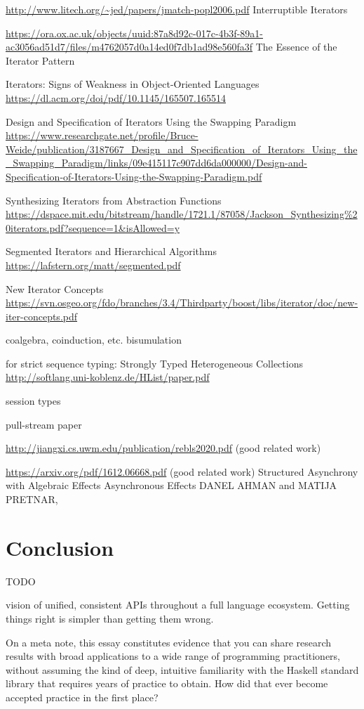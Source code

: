 \documentclass[sigplan,screen,10pt,review]{acmart}
\begin{document}
\url{http://www.litech.org/~jed/papers/jmatch-popl2006.pdf} Interruptible Iterators

\url{https://ora.ox.ac.uk/objects/uuid:87a8d92c-017c-4b3f-89a1-ac3056ad51d7/files/m4762057d0a14ed0f7db1ad98e560fa3f} The Essence of the Iterator Pattern

Iterators: Signs of Weakness in Object-Oriented Languages \url{https://dl.acm.org/doi/pdf/10.1145/165507.165514}

Design and Specification of Iterators Using the Swapping Paradigm \url{https://www.researchgate.net/profile/Bruce-Weide/publication/3187667_Design_and_Specification_of_Iterators_Using_the_Swapping_Paradigm/links/09e415117c907dd6da000000/Design-and-Specification-of-Iterators-Using-the-Swapping-Paradigm.pdf}

Synthesizing Iterators from Abstraction Functions \url{https://dspace.mit.edu/bitstream/handle/1721.1/87058/Jackson_Synthesizing%20iterators.pdf?sequence=1&isAllowed=y}

Segmented Iterators and Hierarchical Algorithms \url{https://lafstern.org/matt/segmented.pdf}

New Iterator Concepts \url{https://svn.osgeo.org/fdo/branches/3.4/Thirdparty/boost/libs/iterator/doc/new-iter-concepts.pdf}

coalgebra, coinduction, etc. bisumulation

for strict sequence typing: Strongly Typed Heterogeneous Collections \url{http://softlang.uni-koblenz.de/HList/paper.pdf}


session types

pull-stream paper

\url{http://jiangxi.cs.uwm.edu/publication/rebls2020.pdf} (good related work)

\url{https://arxiv.org/pdf/1612.06668.pdf} (good related work) Structured Asynchrony with Algebraic Effects
Asynchronous Effects DANEL AHMAN and MATIJA PRETNAR,

\section{Conclusion}\label{conclusion}

TODO

vision of unified, consistent APIs throughout a full language ecosystem. Getting things right is simpler than getting them wrong.

On a meta note, this essay constitutes evidence that you can share research results with broad applications to a wide range of programming practitioners, without assuming the kind of deep, intuitive familiarity with the Haskell standard library that requires years of practice to obtain. How did that ever become accepted practice in the first place?
\end{document}
